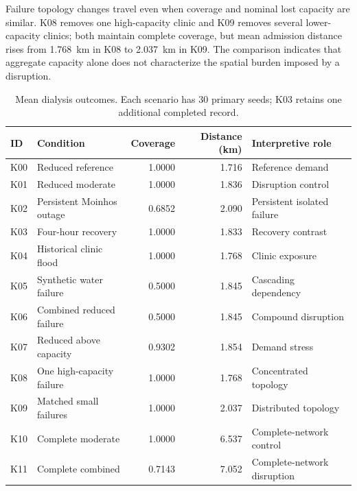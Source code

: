 \documentclass[pdflatex,sn-mathphys-num]{sn-jnl}%
\theoremstyle{thmstyleone}%
\theoremstyle{thmstyletwo}%
\theoremstyle{thmstylethree}%
\begin{document}
Failure topology changes travel even when coverage and nominal lost capacity are similar. K08 removes one high-capacity clinic and K09 removes several lower-capacity clinics; both maintain complete coverage, but mean admission distance rises from 1.768~km in K08 to 2.037~km in K09. The comparison indicates that aggregate capacity alone does not characterize the spatial burden imposed by a disruption.

\begin{table}[ht]
\centering
\footnotesize
\caption{Mean dialysis outcomes. Each scenario has 30 primary seeds; K03 retains one additional completed record.}
\label{tbl:dialysis_results}
\begin{tabularx}{\linewidth}{@{}llrrX@{}}
\toprule
\textbf{ID} & \textbf{Condition} & \textbf{Coverage} & \textbf{Distance (km)} & \textbf{Interpretive role} \\ \midrule
K00 & Reduced reference & 1.0000 & 1.716 & Reference demand \\ 
K01 & Reduced moderate & 1.0000 & 1.836 & Disruption control \\ 
K02 & Persistent Moinhos outage & 0.6852 & 2.090 & Persistent isolated failure \\ 
K03 & Four-hour recovery & 1.0000 & 1.833 & Recovery contrast \\ 
K04 & Historical clinic flood & 1.0000 & 1.768 & Clinic exposure \\ 
K05 & Synthetic water failure & 0.5000 & 1.845 & Cascading dependency \\ 
K06 & Combined reduced failure & 0.5000 & 1.845 & Compound disruption \\ 
K07 & Reduced above capacity & 0.9302 & 1.854 & Demand stress \\ 
K08 & One high-capacity failure & 1.0000 & 1.768 & Concentrated topology \\ 
K09 & Matched small failures & 1.0000 & 2.037 & Distributed topology \\ 
K10 & Complete moderate & 1.0000 & 6.537 & Complete-network control \\ 
K11 & Complete combined & 0.7143 & 7.052 & Complete-network disruption \\ \bottomrule
\end{tabularx}
\end{table}
\end{document}
